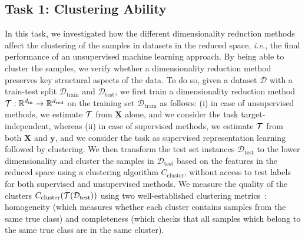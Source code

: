 \subsection{Task 1: Clustering Ability}
\label{sec:ch05:method-ml-task1}
In this task, we investigated how the different dimensionality reduction methods affect the clustering of the samples in datasets in the reduced space, \emph{i.e.}, the final performance of an unsupervised machine learning approach.
By being able to cluster the samples, we verify whether a dimensionality reduction method preserves
key structural aspects of the data.
To do so, given a dataset $\mathcal{D}$ with a train-test split $\mathcal{D}_{\text{train}}$ and $\mathcal{D}_{\text{test}}$, we first train a dimensionality reduction method $\mathcal{T}: \mathbb{R}^{d_{\mathrm{in}}}\rightarrow \mathbb{R}^{d_{\mathrm{red}}}$ on the training set $\mathcal{D}_{\text{train}}$ as follows: (i) in case of unsupervised methods, we estimate $\mathcal{T}$ from $\mathbf X$ alone, and we consider the task target-independent, whereas (ii) in case of supervised methods, we estimate $\mathcal{T}$ from both $\mathbf X$ and $\mathbf y$, and we consider the task as supervised representation learning followed by clustering.
We then transform the test set instances $\mathcal{D}_{\text{test}}$ to the lower dimensionality and cluster the samples in $\mathcal{D}_{\text{test}}$ based on the features in the reduced space using a clustering algorithm $C_{\mathrm{cluster}}$, without access to test labels for both supervised and unsupervised methods.
We measure the quality of the clusters $C_{\mathrm{cluster}}(\mathcal{T}(\mathcal{D}_{\text{test}}))$ using two well-established clustering metrics~\citep{RosHir07}: homogeneity (which measures whether each cluster contains samples from the same true class) and completeness (which checks that all samples which belong to the same true class are in the same cluster).

\FloatBarrier
